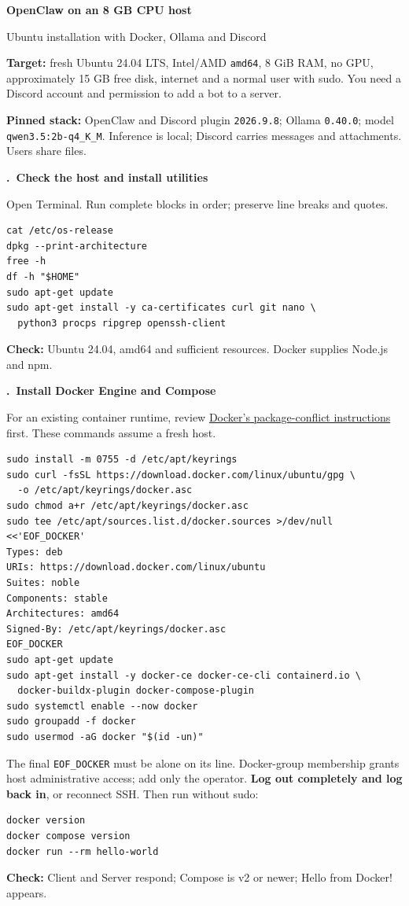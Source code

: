 \documentclass[10pt,a4paper]{article}
\newcounter{step}
\newcommand{\step}[1]{\refstepcounter{step}\vspace{3pt}\par
  {\large\bfseries\color{ink}\thestep.\ #1}\par\vspace{1pt}}
\newcommand{\checkpoint}[1]{\textbf{Check:} #1\par}
\begin{document}
{\LARGE\bfseries OpenClaw on an 8 GB CPU host}\par
{\large Ubuntu installation with Docker, Ollama and Discord}\par
\textbf{Target:} fresh Ubuntu 24.04 LTS, Intel/AMD \texttt{amd64}, 8 GiB RAM,
no GPU, approximately 15 GB free disk, internet and a normal user with sudo.
You need a Discord account and permission to add a bot to a server.

\textbf{Pinned stack:} OpenClaw and Discord plugin \texttt{2026.9.8};
Ollama \texttt{0.40.0}; model \texttt{qwen3.5:2b-q4\_K\_M}.
Inference is local; Discord carries messages and attachments. Users share files.

\step{Check the host and install utilities}
Open Terminal. Run complete blocks in order; preserve line breaks and quotes.
\begin{lstlisting}
cat /etc/os-release
dpkg --print-architecture
free -h
df -h "$HOME"
sudo apt-get update
sudo apt-get install -y ca-certificates curl git nano \
  python3 procps ripgrep openssh-client
\end{lstlisting}
\checkpoint{Ubuntu 24.04, amd64 and sufficient resources. Docker supplies Node.js and npm.}

\step{Install Docker Engine and Compose}
For an existing container runtime, review
\href{https://docs.docker.com/engine/install/ubuntu/}{Docker's package-conflict instructions}
first. These commands assume a fresh host.
\begin{lstlisting}
sudo install -m 0755 -d /etc/apt/keyrings
sudo curl -fsSL https://download.docker.com/linux/ubuntu/gpg \
  -o /etc/apt/keyrings/docker.asc
sudo chmod a+r /etc/apt/keyrings/docker.asc
sudo tee /etc/apt/sources.list.d/docker.sources >/dev/null <<'EOF_DOCKER'
Types: deb
URIs: https://download.docker.com/linux/ubuntu
Suites: noble
Components: stable
Architectures: amd64
Signed-By: /etc/apt/keyrings/docker.asc
EOF_DOCKER
sudo apt-get update
sudo apt-get install -y docker-ce docker-ce-cli containerd.io \
  docker-buildx-plugin docker-compose-plugin
sudo systemctl enable --now docker
sudo groupadd -f docker
sudo usermod -aG docker "$(id -un)"
\end{lstlisting}
The final \texttt{EOF\_DOCKER} must be alone on its line. Docker-group membership
grants host administrative access; add only the operator.
\textbf{Log out completely and log back in}, or reconnect SSH. Then run without sudo:
\begin{lstlisting}
docker version
docker compose version
docker run --rm hello-world
\end{lstlisting}
\checkpoint{Client and Server respond; Compose is v2 or newer; Hello from Docker! appears.}
\end{document}
